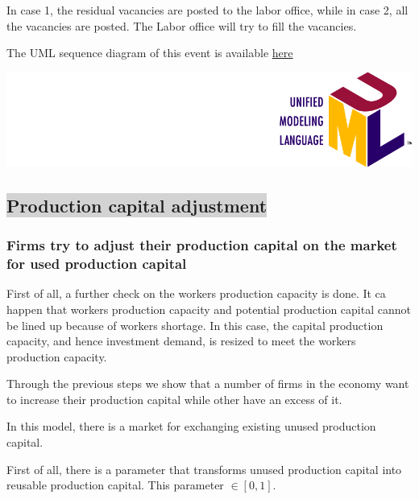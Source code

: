 \documentclass{book}
\newcommand{\doclocation}{file:///Users/giulioni/Documents/workspace/gabriele/docs}
\begin{document}
In case 1, the residual vacancies are posted to the labor office, while in case 2, all the vacancies are posted. The Labor office will try to fill the vacancies. 

\vskip3mm
The UML sequence diagram of this event is available \href{\doclocation/umldoc/laborForceUpwardAdjustment.html}{here}
\begin{marginfigure}
	\includegraphics[scale=0.1]{uml.png}
\end{marginfigure}


\subsection*{\colorbox{lightgray}{Production capital adjustment}}


\subsubsection{Firms try to adjust their production capital on the market for used production capital}

First of all, a further check on the workers production capacity is done.
It ca happen that workers production capacity and potential production capital cannot be lined up because of workers shortage. In this case, the capital production capacity, and hence investment demand, is resized to meet the workers production capacity.

Through the previous steps we show that a number of firms in the economy want to increase their production capital while other have an excess of it.

In this model, there is a market for exchanging existing unused production capital.

First of all, there is a parameter that transforms unused production capital into reusable production capital.
This parameter $\in[0,1]$.
\end{document}
